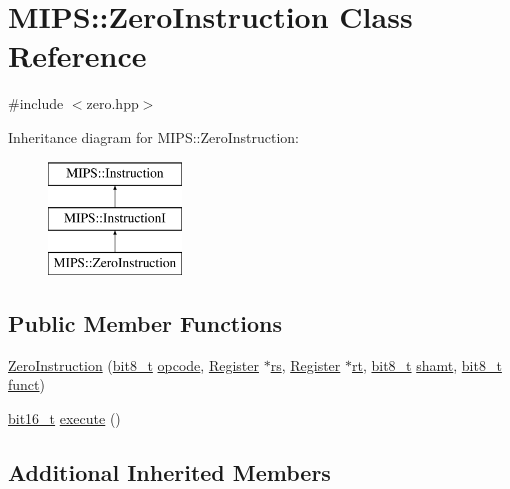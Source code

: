 \hypertarget{classMIPS_1_1ZeroInstruction}{}\section{M\+I\+PS\+:\+:Zero\+Instruction Class Reference}
\label{classMIPS_1_1ZeroInstruction}


{\ttfamily \#include $<$zero.\+hpp$>$}

Inheritance diagram for M\+I\+PS\+:\+:Zero\+Instruction\+:\begin{figure}[H]
\begin{center}
\leavevmode
\includegraphics[height=3.000000cm]{classMIPS_1_1ZeroInstruction}
\end{center}
\end{figure}
\subsection*{Public Member Functions}
\begin{DoxyCompactItemize}
\item 
\hyperlink{classMIPS_1_1ZeroInstruction_ac8e066062f919823b60900d2f3e23348}{Zero\+Instruction} (\hyperlink{core_8hpp_a6074bae122ae7b527864eec42c728c3c}{bit8\+\_\+t} \hyperlink{classMIPS_1_1Instruction_a45cc6808b5dde8a5d41067d148b55476}{opcode}, \hyperlink{classMIPS_1_1Register}{Register} $\ast$\hyperlink{classMIPS_1_1InstructionI_a2be191d5b3dce505e2e626ec02eb4d62}{rs}, \hyperlink{classMIPS_1_1Register}{Register} $\ast$\hyperlink{classMIPS_1_1InstructionI_add1db07a5c954f35271de8c8a5737487}{rt}, \hyperlink{core_8hpp_a6074bae122ae7b527864eec42c728c3c}{bit8\+\_\+t} \hyperlink{classMIPS_1_1InstructionI_aa9b6da37c374c2ec8d96448d341e5e7d}{shamt}, \hyperlink{core_8hpp_a6074bae122ae7b527864eec42c728c3c}{bit8\+\_\+t} \hyperlink{classMIPS_1_1InstructionI_a5c6efcbbd233a7447c1fe24ea0a1e558}{funct})
\item 
\hyperlink{core_8hpp_adc265a970bc35995b5879784bbb3f1b7}{bit16\+\_\+t} \hyperlink{classMIPS_1_1ZeroInstruction_a9596a96b4bf7a51672ab14386d111bad}{execute} ()
\end{DoxyCompactItemize}
\subsection*{Additional Inherited Members}


